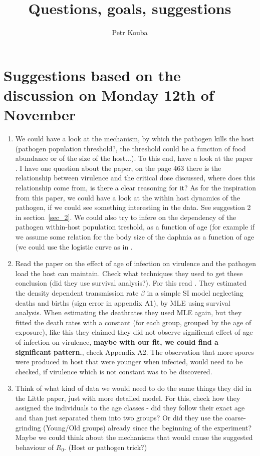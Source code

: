 \documentclass[10pt]{article}         %
\title{Questions, goals, suggestions}
\author{Petr Kouba}
\begin{document}
\maketitle


\section{Suggestions based on the discussion on Monday 12th of November}
\begin{enumerate}\bfseries
\item We could have a look at the mechanism, by which the pathogen kills the host (pathogen population threshold?, the threshold could be a function of food abundance or of the size of the host...). To this end, have a look at the paper \cite{antia}.\newline
{\normalfont I have one question about the paper, on the page 463 there is the relationship between virulence and the critical dose discussed, where does this relationship come from, is there a clear reasoning for it?
 As for the inspiration from this paper, we could have a look at the within host dynamics of the pathogen, if we could see something interesting in the data. See suggestion 2 in section~\ref{sec_2}. We could also try to infere on the dependency of the pathogen within-host population treshold, as a function of age (for example if we assume some relation for the body size of the daphnia as a function of age (we could use the logistic curve as in \cite{continuous_structured_pop}.}
\item Read the paper on the effect of age of infection on virulence and the pathogen load the host can maintain. Check what techniques they used to get these conclusion (did they use survival analysis?). For this read \cite{Izhar_Ben_Ami}.\newline
{\normalfont They estimated the density dependent transmission rate $\beta$ in a simple SI model neglecting deaths and births (sign error in appendix A1), by MLE using survival analysis. When estimating the deathrates they used MLE again, but they fitted the death rates with a constant (for each group, grouped by the age of exposure), like this they claimed they did not observe significant effect of age of infection on virulence, \textbf{maybe with our fit, we could find a significant pattern.}, check Appendix A2. The observation that more spores were produced in host that were younger when infected, would need to be checked, if virulence which is not constant was to be discovered.}
\item Think of what kind of data we would need to do the same things they did in the Little paper, just with more detailed model. For this, check how they assigned the individuals to the age classes - did they follow their exact age and than just separated them into two groups? Or did they use the coarse-grinding (Young/Old groups) already since the beginning of the experiment? Maybe we could think about the mechanisms that would cause the suggested behaviour of $R_0$. (Host or pathogen trick?)\newline

\end{enumerate}
\end{document}
